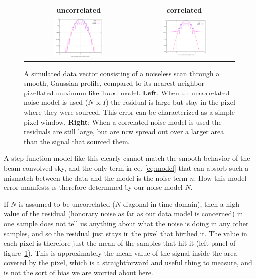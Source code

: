\documentclass{article}
\newcommand{\dfn}[1]{\textbf{#1}}
\begin{document}
\begin{figure}[ph!]
	\centering
	\begin{tabular}{cc}
		\bf uncorrelated & \bf correlated \\
		\includegraphics[width=0.48\textwidth]{examples/src_1d_uncorr_tod_log.pdf} &
		\includegraphics[width=0.48\textwidth]{examples/src_1d_corr_tod_log.pdf}
	\end{tabular}
	\caption{A simulated data vector consisting of a noiseless scan through a smooth, Gaussian profile,
		compared to its nearest-neighbor-pixellated maximum likelihood
		model. \dfn{Left}: When an uncorrelated noise model is used ($N \propto I$)
		the residual is large but stay in the pixel where they were sourced. This error can
		be characterized as a simple pixel window. \dfn{Right}: When a correlated noise
		model is used the residuals are still large, but are now spread out over a larger area
		than the signal that sourced them.}
		\label{fig:subpix1d}
\end{figure}

A step-function model like this clearly cannot match the smooth behavior of the beam-convolved
sky, and the only term in eq. \ref{eq:model} that can absorb such a mismatch between the data
and the model is the noise term $n$. How this model error manifests is therefore determined by
our noise model $N$.

If $N$ is assumed to be uncorrelated ($N$ diagonal in time domain), then a high value of the residual
(honorary noise as far as our data model is concerned) in one sample does not tell us
anything about what the noise is doing in any other samples, and so the residual
just stays in the pixel that birthed it. The value in each pixel is therefore just
the mean of the samples that hit it (left panel of figure~\ref{fig:subpix1d}).
This is approximately
the mean value of the signal inside the area covered by the pixel, which is a straightforward
and useful thing to measure, and is not the sort of bias we are worried about here.
\end{document}

